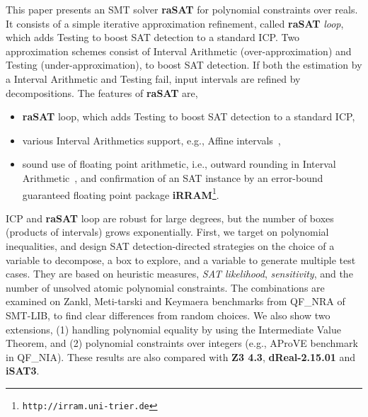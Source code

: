 \documentclass[runningheads,a4paper,oribibl]{llncs}
\begin{document}
This paper presents an SMT solver {\bf raSAT} for polynomial constraints over reals. 
It consists of a simple iterative approximation refinement, called {\bf raSAT} {\em loop}, 
which adds Testing to boost SAT detection to a standard ICP. 
Two approximation schemes consist of Interval Arithmetic (over-approximation) and 
Testing (under-approximation), to boost SAT detection. 
If both the estimation by a Interval Arithmetic and Testing fail, input intervals are refined by decompositions. 
%
The features of {\bf raSAT} are, 
\begin{itemize}
\item {\bf raSAT} loop, which adds Testing to boost SAT detection to a standard ICP, 
\item various Interval Arithmetics support, e.g., 
Affine intervals~\cite{Messine_extensionsof,Ngoc:2009:ORE:1685167.1685421,VanKhanh201227}, 
\item sound use of floating point arithmetic, i.e., 
outward rounding in Interval Arithmetic~\cite{Hickey:2001:IAP:502102.502106}, 
and confirmation of an SAT instance by an error-bound guaranteed floating point package {\bf iRRAM}\footnote{%
\tt http://irram.uni-trier.de}. 
\end{itemize}

ICP and {\bf raSAT} loop are robust for large degrees, but the number of boxes (products of intervals) 
grows exponentially. 
First, we target on polynomial inequalities, and design SAT detection-directed strategies on 
the choice of a variable to decompose, a box to explore, and a variable to generate multiple test cases. 
They are based on heuristic measures, {\em SAT likelihood}, {\em sensitivity}, and the number of 
unsolved atomic polynomial constraints. 
The combinations are examined on Zankl, Meti-tarski and Keymaera benchmarks from 
QF\_NRA of SMT-LIB, to find clear differences from random choices. 
We also show two extensions, (1) handling polynomial equality by using the Intermediate Value Theorem, 
and (2) polynomial constraints over integers (e.g., AProVE benchmark in QF\_NIA). 
These results are also compared with {\bf Z3 4.3}, \textbf{dReal-2.15.01} and {\bf iSAT3}. 
\end{document}
